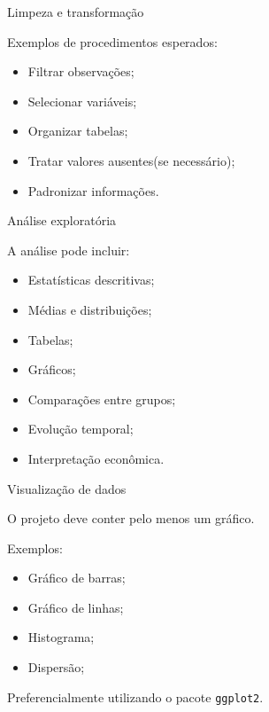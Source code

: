 \documentclass[11pt]{beamer}
\begin{document}
	\begin{frame}{Limpeza e transformação}
		
		Exemplos de procedimentos esperados:
		
		\begin{itemize}
			\item Filtrar observações;
			\item Selecionar variáveis;
			\item Organizar tabelas;
			\item Tratar valores ausentes(se necessário);
			\item Padronizar informações.
		\end{itemize}
		
	\end{frame}
	
	\begin{frame}{Análise exploratória}
		
		A análise pode incluir:
		
		\begin{itemize}
			\item Estatísticas descritivas;
			\item Médias e distribuições;
			\item Tabelas;
			\item Gráficos;
			\item Comparações entre grupos;
			\item Evolução temporal;
			\item Interpretação econômica.
		\end{itemize}
		
	\end{frame}
	
	\begin{frame}{Visualização de dados}
		
		O projeto deve conter pelo menos um gráfico.
		
		\vspace{0.3cm}
		
		Exemplos:
		
		\begin{itemize}
			\item Gráfico de barras;
			\item Gráfico de linhas;
			\item Histograma;
			\item Dispersão;
		\end{itemize}
		
		\vspace{0.3cm}
		
		Preferencialmente utilizando o pacote \texttt{ggplot2}.
		
	\end{frame}
	
\end{document}
